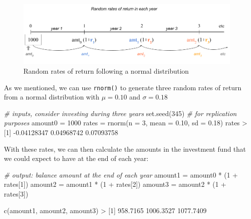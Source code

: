 \documentclass[
]{book}
\newenvironment{Shaded}{\begin{snugshade}}{\end{snugshade}}
\newcommand{\AttributeTok}[1]{\textcolor[rgb]{0.77,0.63,0.00}{#1}}
\newcommand{\CommentTok}[1]{\textcolor[rgb]{0.56,0.35,0.01}{\textit{#1}}}
\newcommand{\DecValTok}[1]{\textcolor[rgb]{0.00,0.00,0.81}{#1}}
\newcommand{\FloatTok}[1]{\textcolor[rgb]{0.00,0.00,0.81}{#1}}
\newcommand{\FunctionTok}[1]{\textcolor[rgb]{0.00,0.00,0.00}{#1}}
\newcommand{\NormalTok}[1]{#1}
\newcommand{\OtherTok}[1]{\textcolor[rgb]{0.56,0.35,0.01}{#1}}
\newcommand{\SpecialCharTok}[1]{\textcolor[rgb]{0.00,0.00,0.00}{#1}}
\begin{document}
\begin{figure}

{\centering \includegraphics[width=0.95\linewidth]{images/iterations/timeline-investment-stock-market2} 

}

\caption{Random rates of return following a normal distribution}\label{fig:unnamed-chunk-284}
\end{figure}

As we mentioned, we can use \texttt{rnorm()} to generate three random rates of return
from a normal distribution with \(\mu = 0.10\) and \(\sigma = 0.18\)

\begin{Shaded}
\begin{Highlighting}[]
\CommentTok{\# inputs, consider investing during three years}
\FunctionTok{set.seed}\NormalTok{(}\DecValTok{345}\NormalTok{)   }\CommentTok{\# for replication purposes}
\NormalTok{amount0 }\OtherTok{=} \DecValTok{1000}
\NormalTok{rates }\OtherTok{=} \FunctionTok{rnorm}\NormalTok{(}\AttributeTok{n =} \DecValTok{3}\NormalTok{, }\AttributeTok{mean =} \FloatTok{0.10}\NormalTok{, }\AttributeTok{sd =} \FloatTok{0.18}\NormalTok{)}
\NormalTok{rates}
\SpecialCharTok{\textgreater{}}\NormalTok{ [}\DecValTok{1}\NormalTok{] }\SpecialCharTok{{-}}\FloatTok{0.04128347}  \FloatTok{0.04968742}  \FloatTok{0.07093758}
\end{Highlighting}
\end{Shaded}

With these rates, we can then calculate the amounts in the investment fund that
we could expect to have at the end of each year:

\begin{Shaded}
\begin{Highlighting}[]
\CommentTok{\# output: balance amount at the end of each year}
\NormalTok{amount1 }\OtherTok{=}\NormalTok{ amount0 }\SpecialCharTok{*}\NormalTok{ (}\DecValTok{1} \SpecialCharTok{+}\NormalTok{ rates[}\DecValTok{1}\NormalTok{])}
\NormalTok{amount2 }\OtherTok{=}\NormalTok{ amount1 }\SpecialCharTok{*}\NormalTok{ (}\DecValTok{1} \SpecialCharTok{+}\NormalTok{ rates[}\DecValTok{2}\NormalTok{])}
\NormalTok{amount3 }\OtherTok{=}\NormalTok{ amount2 }\SpecialCharTok{*}\NormalTok{ (}\DecValTok{1} \SpecialCharTok{+}\NormalTok{ rates[}\DecValTok{3}\NormalTok{])}

\FunctionTok{c}\NormalTok{(amount1, amount2, amount3)}
\SpecialCharTok{\textgreater{}}\NormalTok{ [}\DecValTok{1}\NormalTok{]  }\FloatTok{958.7165} \FloatTok{1006.3527} \FloatTok{1077.7409}
\end{Highlighting}
\end{Shaded}
\end{document}
